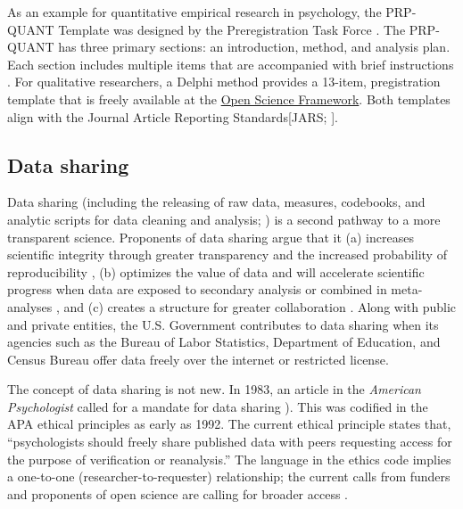 \documentclass[
  11pt,
]{book}
\begin{document}
As an example for quantitative empirical research in psychology, the PRP-QUANT Template was designed by the Preregistration Task Force \citeyearpar{preregistration_task_force_preregistration_2021}. The PRP-QUANT has three primary sections: an introduction, method, and analysis plan. Each section includes multiple items that are accompanied with brief instructions \citep{bosnjak_template_2021}. For qualitative researchers, a Delphi method \citep{haven_preregistering_2020} provides a 13-item, pregistration template that is freely available at the \href{https://doi.org/10.31235/osf.io/pz9j}{Open Science Framework}. Both templates align with the Journal Article Reporting Standards{[}JARS; \citet{american_psychological_association_publication_2020}{]}.

\hypertarget{data-sharing}{%
\subsection{Data sharing}\label{data-sharing}}

Data sharing (including the releasing of raw data, measures, codebooks, and analytic scripts for data cleaning and analysis; \citet{alter_responsible_2018}) is a second pathway to a more transparent science. Proponents of data sharing argue that it (a) increases scientific integrity through greater transparency and the increased probability of reproducibility \citep{martone_data_2018}, (b) optimizes the value of data and will accelerate scientific progress when data are exposed to secondary analysis or combined in meta-analyses \citep{ross_ethical_2018}, and (c) creates a structure for greater collaboration \citep{bezjak_open_2018}. Along with public and private entities, the U.S. Government contributes to data sharing when its agencies such as the Bureau of Labor Statistics, Department of Education, and Census Bureau offer data freely over the internet or restricted license.

The concept of data sharing is not new. In 1983, an article in the \emph{American Psychologist} called for a mandate for data sharing \citep{ceci_private_1983}). This was codified in the APA ethical principles as early as 1992. The current ethical principle \citep{american_psychological_association_ethical_2017} states that, ``psychologists should freely share published data with peers requesting access for the purpose of verification or reanalysis.'' The language in the ethics code implies a one-to-one (researcher-to-requester) relationship; the current calls from funders and proponents of open science are calling for broader access \citep{martone_data_2018}.
\end{document}
